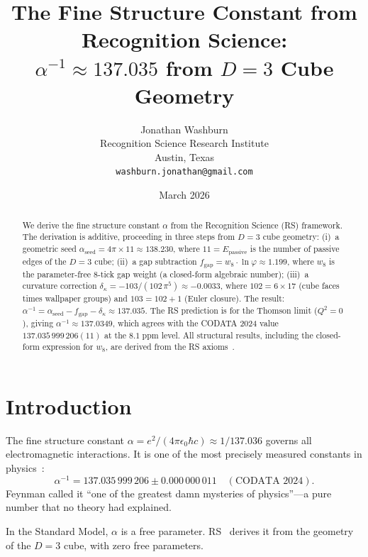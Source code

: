 \documentclass[12pt,a4paper]{article}
\title{The Fine Structure Constant from Recognition Science:\\
$\alpha^{-1} \approx 137.035$ from $D = 3$ Cube Geometry}
\author{Jonathan Washburn\\
Recognition Science Research Institute\\
Austin, Texas\\
\texttt{washburn.jonathan@gmail.com}}
\date{March 2026}
\theoremstyle{definition}
\theoremstyle{remark}
\begin{document}
\maketitle

\begin{abstract}
We derive the fine structure constant $\alpha$ from the Recognition
Science (RS) framework.  The derivation is additive, proceeding in
three steps from $D = 3$ cube geometry:
(i)~a geometric seed $\alpha_{\mathrm{seed}} = 4\pi \times 11
\approx 138.230$, where $11 = E_{\mathrm{passive}}$ is the number
of passive edges of the $D = 3$ cube;
(ii)~a gap subtraction $f_{\mathrm{gap}} = w_8 \cdot \ln\varphi
\approx 1.199$, where $w_8$ is the parameter-free 8-tick gap
weight (a closed-form algebraic number);
(iii)~a curvature correction $\delta_\kappa = -103/(102\,\pi^5)
\approx -0.0033$, where $102 = 6 \times 17$ (cube faces times
wallpaper groups) and $103 = 102 + 1$ (Euler closure).  The
result:
$\alpha^{-1} = \alpha_{\mathrm{seed}} - f_{\mathrm{gap}} -
\delta_\kappa \approx 137.035$.
The RS prediction is for the Thomson limit ($Q^2 = 0$), giving
$\alpha^{-1} \approx 137.0349$, which agrees with the CODATA 2024
value $137.035\,999\,206(11)$ at the $8.1\;\mathrm{ppm}$ level.
All structural results, including the closed-form expression for
$w_8$, are derived from the RS axioms~\cite{RS_Axioms}.
\end{abstract}

\section{Introduction}
\label{sec:intro}

The fine structure constant
$\alpha = e^2/(4\pi\epsilon_0\hbar c) \approx 1/137.036$ governs
all electromagnetic interactions.  It is one of the most precisely
measured constants in physics~\cite{Morel2020}:
\begin{equation}
  \alpha^{-1} = 137.035\,999\,206 \pm 0.000\,000\,011
  \quad (\text{CODATA 2024}).
\end{equation}
Feynman called it ``one of the greatest damn mysteries of
physics''---a pure number that no theory had explained.

In the Standard Model, $\alpha$ is a free parameter.  RS~\cite{RS_Axioms} derives
it from the geometry of the $D = 3$ cube, with zero free
parameters.

\end{document}
